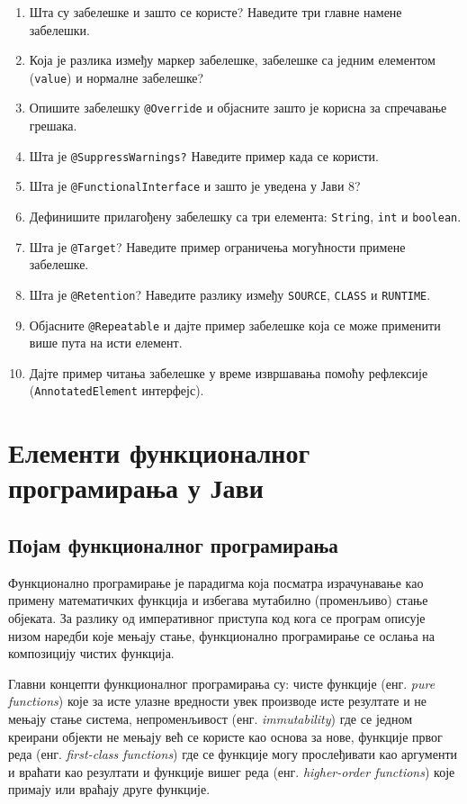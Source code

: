 \begin{enumerate}
\item Шта су забелешке и зашто се користе? Наведите три главне намене забелешки.
\item Која је разлика између маркер забелешке, забелешке са једним елементом (\texttt{value}) и нормалне забелешке?
\item Опишите забелешку \texttt{@Override} и објасните зашто је корисна за спречавање грешака.
\item Шта је \texttt{@SuppressWarnings?} Наведите пример када се користи.
\item Шта је \texttt{@FunctionalInterface} и зашто је уведена у Јави 8?
\item Дефинишите прилагођену забелешку са три елемента: \texttt{String}, \texttt{int} и \texttt{boolean}.
\item Шта је \texttt{@Target}? Наведите пример ограничења могућности примене забелешке.
\item Шта је \texttt{@Retention}? Наведите разлику између \texttt{SOURCE}, \texttt{CLASS} и \texttt{RUNTIME}.
\item Објасните \texttt{@Repeatable} и дајте пример забелешке која се може применити више пута на исти елемент.
\item Дајте пример читања забелешке у време извршавања помоћу рефлексије (\texttt{AnnotatedElement} интерфејс).
\end{enumerate}


\setlength{\parindent}{15pt}
\setlength{\parskip}{0pt}
\chapter{Елементи функционалног програмирања у Јави}


\section{Појам функционалног програмирања}

Функционално програмирање је парадигма која посматра израчунавање као примену математичких функција и избегава мутабилно (променљиво) стање објеката. За разлику од императивног приступа код кога се програм описује низом наредби које мењају стање, функционално програмирање се ослања на композицију чистих функција.

Главни концепти функционалног програмирања су: чисте функције (енг. \textit{pure functions}) које за исте улазне вредности увек производе исте резултате и не мењају стање система, непроменљивост (енг. \textit{immutability}) где се једном креирани објекти не мењају већ се користе као основа за нове, функције првог реда (енг. \textit{first-class functions}) где се функције могу прослеђивати као аргументи и враћати као резултати и функције вишег реда (енг. \textit{higher-order functions}) које примају или враћају друге функције.

